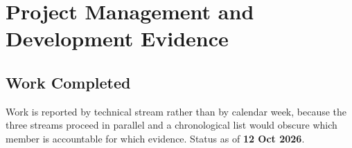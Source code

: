 \chapter{Project Management and Development Evidence}


\section{Work Completed}

Work is reported by technical stream rather than by calendar week, because the
three streams proceed in parallel and a chronological list would obscure which
member is accountable for which evidence. Status as of \textbf{12 Oct 2026}.

